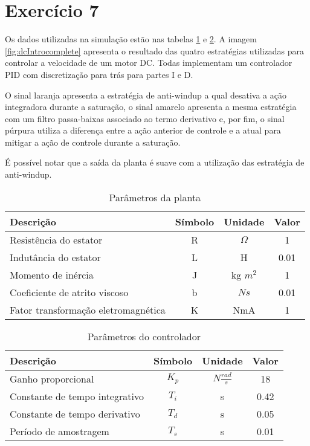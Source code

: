 \section*{Exercício 7}
\label{ex:7}

Os dados utilizadas na simulação estão nas tabelas \ref{tab:ex7planta} e \ref{tab:ex7controlador}. A imagem \ref{fig:dcIntrocomplete} apresenta o resultado das quatro estratégias utilizadas para controlar a velocidade de um motor DC. Todas implementam um controlador PID com discretização para trás para partes I e D. 

O sinal laranja apresenta a estratégia de anti-windup a qual desativa a ação integradora durante a saturação, o sinal amarelo apresenta a mesma estratégia com um filtro passa-baixas associado ao termo derivativo e, por fim, o sinal púrpura utiliza a diferença entre a ação anterior de controle e a atual para mitigar a ação de controle durante a saturação.

É possível notar que a saída da planta é suave com a utilização das estratégia de anti-windup. 

\begin{table}[htp]
    \centering
    \begin{tabular}{|l|c|c|c|}
    \hline
    Descrição & Símbolo & Unidade & Valor \\ \hline
    Resistência do estator & R & $\Omega$ & 1 \\
    Indutância do estator & L & H & 0.01 \\
    Momento de inércia & J & kg $m^2$  & 1 \\
    Coeficiente de atrito viscoso & b & $Ns$ & 0.01 \\
    Fator transformação eletromagnética & K & NmA & 1 \\\hline
    \end{tabular}
    \caption{Parâmetros da planta}
    \label{tab:ex7planta}
\end{table}

\begin{table}[htp]
    \centering
    \begin{tabular}{|l|c|c|c|}
    \hline
    Descrição & Símbolo & Unidade & Valor \\ \hline
    Ganho proporcional & $K_p$ & $N \frac{rad}{s}$ & 18 \\
    Constante de tempo integrativo & $T_i$ & s & 0.42 \\
    Constante de tempo derivativo & $T_d$ & s  & 0.05 \\
    Período de amostragem & $T_s$ & s & 0.01 \\\hline
    \end{tabular}
    \caption{Parâmetros do controlador}
    \label{tab:ex7controlador}
\end{table}

